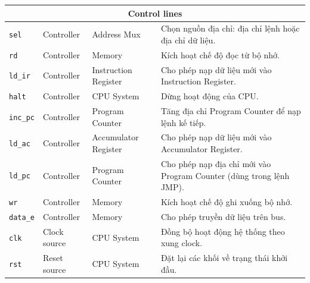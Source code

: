 \begin{longtable}{|p{}|p{}|p{}|p{}|}
            \multicolumn{4}{|c|}{\textbf{Control lines}} \\\hline
            \texttt{sel} & Controller & Address Mux & Chọn nguồn địa chỉ: địa chỉ lệnh hoặc địa chỉ dữ liệu. \\
            \hline
            \texttt{rd} & Controller & Memory & Kích hoạt chế độ đọc từ bộ nhớ. \\
            \hline
            \texttt{ld\_ir} & Controller & Instruction Register & Cho phép nạp dữ liệu mới vào Instruction Register. \\
            \hline
            \texttt{halt} & Controller & CPU System & Dừng hoạt động của CPU. \\
            \hline
            \texttt{inc\_pc} & Controller & Program Counter & Tăng địa chỉ Program Counter để nạp lệnh kế tiếp. \\
            \hline
            \texttt{ld\_ac} & Controller & Accumulator Register & Cho phép nạp dữ liệu mới vào Accumulator Register. \\
            \hline
            \texttt{ld\_pc} & Controller & Program Counter & Cho phép nạp địa chỉ mới vào Program Counter (dùng trong lệnh JMP). \\
            \hline
            \texttt{wr} & Controller & Memory & Kích hoạt chế độ ghi xuống bộ nhớ. \\
            \hline
            \texttt{data\_e} & Controller & Memory & Cho phép truyền dữ liệu trên bus. \\
            \hline
            \texttt{clk} & Clock source & CPU System & Đồng bộ hoạt động hệ thống theo xung clock. \\
            \hline
            \texttt{rst} & Reset source & CPU System & Đặt lại các khối về trạng thái khởi đầu. \\
            \hline
        \end{longtable}

